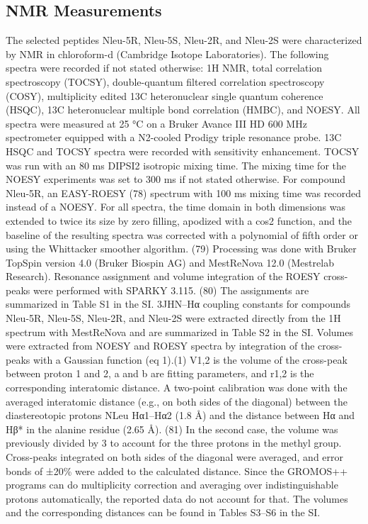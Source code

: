 \subsection{NMR Measurements}
The selected peptides Nleu-5R, Nleu-5S, Nleu-2R, and Nleu-2S were characterized by NMR in chloroform-d (Cambridge Isotope Laboratories).
The following spectra were recorded if not stated otherwise: 1H NMR, total correlation spectroscopy (TOCSY), double-quantum filtered correlation spectroscopy (COSY), multiplicity edited 13C heteronuclear single quantum coherence (HSQC), 13C heteronuclear multiple bond correlation (HMBC), and NOESY.
All spectra were measured at 25 °C on a Bruker Avance III HD 600 MHz spectrometer equipped with a N2-cooled Prodigy triple resonance probe.
13C HSQC and TOCSY spectra were recorded with sensitivity enhancement. TOCSY was run with an 80 ms DIPSI2 isotropic mixing time.
The mixing time for the NOESY experiments was set to 300 ms if not stated otherwise. 
For compound Nleu-5R, an EASY-ROESY (78) spectrum with 100 ms mixing time was recorded instead of a NOESY. 
For all spectra, the time domain in both dimensions was extended to twice its size by zero filling, apodized with a cos2 function, and the baseline of the resulting spectra was corrected with a polynomial of fifth order or using the Whittacker smoother algorithm. (79)
Processing was done with Bruker TopSpin version 4.0 (Bruker Biospin AG) and MestReNova 12.0 (Mestrelab Research). Resonance assignment and volume integration of the ROESY cross-peaks were performed with SPARKY 3.115. (80)
The assignments are summarized in Table S1 in the SI.
3JHN–Hα coupling constants for compounds Nleu-5R, Nleu-5S, Nleu-2R, and Nleu-2S were extracted directly from the 1H spectrum with MestReNova and are summarized in Table S2 in the SI.
Volumes were extracted from NOESY and ROESY spectra by integration of the cross-peaks with a Gaussian function (eq 1).(1)
V1,2 is the volume of the cross-peak between proton 1 and 2, a and b are fitting parameters, and r1,2 is the corresponding interatomic distance.
A two-point calibration was done with the averaged interatomic distance (e.g., on both sides of the diagonal) between the diastereotopic protons NLeu Hα1–Hα2 (1.8 Å) and the distance between Hα and Hβ* in the alanine residue (2.65 Å). (81)
In the second case, the volume was previously divided by 3 to account for the three protons in the methyl group. 
Cross-peaks integrated on both sides of the diagonal were averaged, and error bonds of ±20\% were added to the calculated distance. 
Since the GROMOS++ programs can do multiplicity correction and averaging over indistinguishable protons automatically, the reported data do not account for that. 
The volumes and the corresponding distances can be found in Tables S3–S6 in the SI.